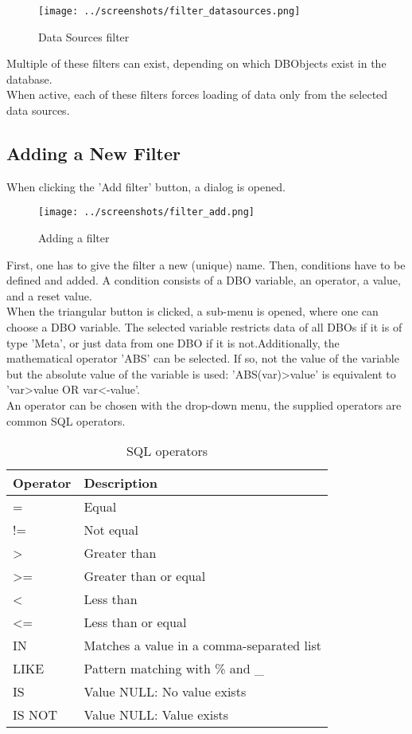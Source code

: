 \begin{figure}[H]
  \center
    \texttt{[image: ../screenshots/filter\_datasources.png]}
  \caption{Data Sources filter}
\end{figure}

Multiple of these filters can exist, depending on which DBObjects exist in the database. \\

When active, each of these filters forces loading of data only from the selected data sources. \\

\subsection{Adding a New Filter}
When clicking the 'Add filter' button, a dialog is opened.

\begin{figure}[H]
  \center
    \texttt{[image: ../screenshots/filter\_add.png]}
  \caption{Adding a filter}
  \label{fig:filter_add}
\end{figure}

First, one has to give the filter a new (unique) name. Then, conditions have to be defined and added. A condition consists of a DBO variable, an operator, a value, and a reset value. \\

When the triangular button is clicked, a sub-menu is opened, where one can choose a DBO variable. The selected variable restricts data of all DBOs if it is of type 'Meta', or just data from one DBO if it is not.Additionally, the mathematical operator 'ABS' can be selected. If so, not the value of the variable but the absolute value of the variable is used: 'ABS(var)>value' is equivalent to 'var>value OR var<-value'. \\

An operator can be chosen with the drop-down menu, the supplied operators are common SQL operators.

\begin{table}[H]
  \center
  \begin{tabular}{ | l | l |}
    \hline
    \textbf{Operator} & \textbf{Description} \\ \hline
    = & Equal \\ \hline
    != & Not equal \\ \hline
    > & Greater than \\ \hline
    >= & Greater than or equal \\ \hline
    < & Less than \\ \hline
    <= & Less than or equal \\ \hline
    IN & Matches a value in a comma-separated list \\ \hline
    LIKE & Pattern matching with \% and \_ \\ \hline
    IS & Value NULL: No value exists \\ \hline
    IS NOT & Value NULL: Value exists \\
    \hline
  \end{tabular}
  \caption{SQL operators}
\end{table}


